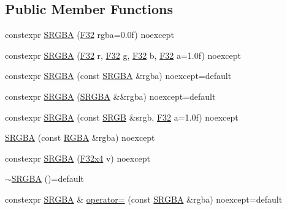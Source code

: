 \subsection*{Public Member Functions}
\begin{DoxyCompactItemize}
\item 
constexpr \mbox{\hyperlink{structmage_1_1_s_r_g_b_a_ab2d736d077534d550020b0f01e5780ae}{S\+R\+G\+BA}} (\mbox{\hyperlink{namespacemage_aa97e833b45f06d60a0a9c4fc22ae02c0}{F32}} rgba=0.\+0f) noexcept
\item 
constexpr \mbox{\hyperlink{structmage_1_1_s_r_g_b_a_a159096e69a7e18eee0d6718d244a1493}{S\+R\+G\+BA}} (\mbox{\hyperlink{namespacemage_aa97e833b45f06d60a0a9c4fc22ae02c0}{F32}} r, \mbox{\hyperlink{namespacemage_aa97e833b45f06d60a0a9c4fc22ae02c0}{F32}} g, \mbox{\hyperlink{namespacemage_aa97e833b45f06d60a0a9c4fc22ae02c0}{F32}} b, \mbox{\hyperlink{namespacemage_aa97e833b45f06d60a0a9c4fc22ae02c0}{F32}} a=1.\+0f) noexcept
\item 
constexpr \mbox{\hyperlink{structmage_1_1_s_r_g_b_a_a2f1125cfd0ba308a1f249e2b43637031}{S\+R\+G\+BA}} (const \mbox{\hyperlink{structmage_1_1_s_r_g_b_a}{S\+R\+G\+BA}} \&rgba) noexcept=default
\item 
constexpr \mbox{\hyperlink{structmage_1_1_s_r_g_b_a_abb441510c3afe709ddfb6f094f1ba2e5}{S\+R\+G\+BA}} (\mbox{\hyperlink{structmage_1_1_s_r_g_b_a}{S\+R\+G\+BA}} \&\&rgba) noexcept=default
\item 
constexpr \mbox{\hyperlink{structmage_1_1_s_r_g_b_a_a5ff3a33ee8ee285bec1735e8c796a766}{S\+R\+G\+BA}} (const \mbox{\hyperlink{structmage_1_1_s_r_g_b}{S\+R\+GB}} \&srgb, \mbox{\hyperlink{namespacemage_aa97e833b45f06d60a0a9c4fc22ae02c0}{F32}} a=1.\+0f) noexcept
\item 
\mbox{\hyperlink{structmage_1_1_s_r_g_b_a_a17b38cf5574d403a22e0bacbfc1c9416}{S\+R\+G\+BA}} (const \mbox{\hyperlink{structmage_1_1_r_g_b_a}{R\+G\+BA}} \&rgba) noexcept
\item 
constexpr \mbox{\hyperlink{structmage_1_1_s_r_g_b_a_a172912ff3393d3ffee54f63135cfee3c}{S\+R\+G\+BA}} (\mbox{\hyperlink{namespacemage_a759aaad2fdc75aa93b5b614eb01712c4}{F32x4}} v) noexcept
\item 
\mbox{\hyperlink{structmage_1_1_s_r_g_b_a_a1a3df218eb9077b50380b831dbbfc753}{$\sim$\+S\+R\+G\+BA}} ()=default
\item 
constexpr \mbox{\hyperlink{structmage_1_1_s_r_g_b_a}{S\+R\+G\+BA}} \& \mbox{\hyperlink{structmage_1_1_s_r_g_b_a_affa097b1744a66624f40102870909ea9}{operator=}} (const \mbox{\hyperlink{structmage_1_1_s_r_g_b_a}{S\+R\+G\+BA}} \&rgba) noexcept=default

\end{DoxyCompactItemize}
